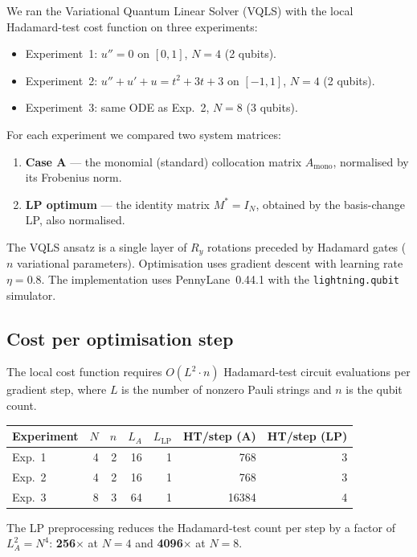 \documentclass{article}
\begin{document}
We ran the Variational Quantum Linear Solver (VQLS) with the local Hadamard-test
cost function on three experiments:
\begin{itemize}
    \item Experiment~1: $u''=0$ on $[0,1]$, $N=4$ (2 qubits).
    \item Experiment~2: $u''+u'+u = t^2+3t+3$ on $[-1,1]$, $N=4$ (2 qubits).
    \item Experiment~3: same ODE as Exp.~2, $N=8$ (3 qubits).
\end{itemize}
For each experiment we compared two system matrices:
\begin{enumerate}
    \item \textbf{Case A} --- the monomial (standard) collocation matrix
    $A_{\mathrm{mono}}$, normalised by its Frobenius norm.
    \item \textbf{LP optimum} --- the identity matrix $M^*=I_N$, obtained by
    the basis-change LP, also normalised.
\end{enumerate}
The VQLS ansatz is a single layer of $R_y$ rotations preceded by Hadamard gates
($n$ variational parameters).  Optimisation uses gradient descent with learning
rate $\eta=0.8$.  The implementation uses PennyLane~0.44.1 with the
\texttt{lightning.qubit} simulator.

\subsection*{Cost per optimisation step}

The local cost function requires $O(L^2 \cdot n)$ Hadamard-test circuit
evaluations per gradient step, where $L$ is the number of nonzero Pauli strings
and $n$ is the qubit count.

\begin{center}
\begin{tabular}{lrrrrrr}
\toprule
Experiment & $N$ & $n$ & $L_A$ & $L_{\mathrm{LP}}$ & HT/step (A) & HT/step (LP) \\
\midrule
Exp.~1 & 4 & 2 & 16 & 1 & 768 & 3 \\
Exp.~2 & 4 & 2 & 16 & 1 & 768 & 3 \\
Exp.~3 & 8 & 3 & 64 & 1 & 16384 & 4 \\
\bottomrule
\end{tabular}
\end{center}

The LP preprocessing reduces the Hadamard-test count per step by a factor of
$L_A^2 = N^4$: \textbf{256$\times$} at $N=4$ and \textbf{4096$\times$} at
$N=8$.
\end{document}
